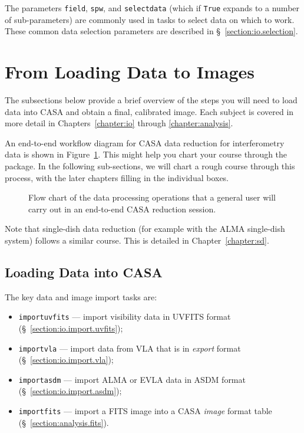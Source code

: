 The parameters {\tt field}, {\tt spw}, and {\tt selectdata} (which if
{\tt True} expands to a number of sub-parameters) are commonly used in
tasks to select data on which to work.  These common data selection
parameters are described in \S~\ref{section:io.selection}.


\section{From Loading Data to Images}
\label{section:intro.walkthru}

The subsections below provide a brief overview of the steps you will
need to load data into CASA and obtain a final, calibrated image.
Each subject is covered in more detail in Chapters~\ref{chapter:io}
through \ref{chapter:analysis}.

An end-to-end workflow diagram for CASA data reduction for
interferometry data is shown in Figure~\ref{fig:casaflow}.  
This might help you chart your course through the package.
In the following sub-sections, we will chart a rough course through
this process, with the later chapters filling in the individual
boxes.

\begin{figure}[h!]
\caption{\label{fig:casaflow}
Flow chart of the data processing operations that a general 
user will carry out in an end-to-end CASA reduction session.}
\hrulefill
\end{figure}

Note that single-dish data reduction (for example with the ALMA
single-dish system) follows a similar course.  This is detailed
in Chapter~\ref{chapter:sd}.

\subsection{Loading Data into CASA}
\label{section:intro.walkthru.load}

The key data and image import tasks are:
\begin{itemize}
   \item {\tt importuvfits} --- import visibility data in UVFITS
         format (\S~\ref{section:io.import.uvfits});
   \item {\tt importvla} --- import data from VLA that is in 
         {\it export} format (\S~\ref{section:io.import.vla});
   \item {\tt importasdm} --- import ALMA or EVLA data in ASDM format 
         (\S~\ref{section:io.import.asdm});
   \item {\tt importfits} --- import a FITS image into a CASA  
         {\it image} format table (\S~\ref{section:analysis.fits}).
\end{itemize}

